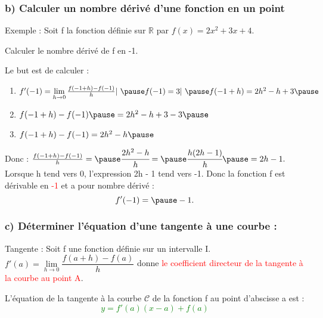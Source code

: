 \documentclass[t]{beamer}
\begin{document}
	\begin{frame}[label=pagebanale]
		\frametitle{b) Calculer un nombre dérivé d'une fonction en un point}
		\pause
		\begin{exampleblock}{Exemple :}
			\pause
			Soit f la fonction définie sur $\mathbb{R}$ par $f(x) = 2x^2 + 3x + 4.$

			\pause
			Calculer le nombre dérivé de f en -1.
			\pause
		\end{exampleblock}
		\begin{block}{Le but est de calculer :}
			\pause
			\begin{enumerate}[]
				\item \textcolor{green}{\(f'(-1) = \lim\limits_{h \rightarrow 0}\frac{f(-1+h) - f(-1)}{h}  |  \ \pause f(-1) = 3  |   \ \pause f(-1+ h) = 2h^2 - h + 3 \pause\)}
				\item \(f(-1+ h) - f(-1) \pause = 2h^2 -h + 3 - 3 \pause \)
				\item \(f(-1+ h) - f(-1)  = 2h^2 -h \pause \)
			\end{enumerate}
			\pause
			Donc : 
			\( \frac{f(-1+ h) - f(-1)}{h} = \pause \cfrac{ 2h^2-h}{h} = \pause \cfrac{ h(2h-1)}{h} \pause = 2h - 1.\) 
			\pause
			Lorsque h tend vers 0, \pause l'expression 2h - 1 tend vers -1. \pause
			Donc la fonction f est dérivable en \textcolor{red}{-1} \pause et a pour nombre dérivé : \pause
			\textcolor{red}{\[f'(-1) = \pause -1.\]}
		\end{block}
	\end{frame}


	\begin{frame}[label=pagebanale]
		\frametitle{c) Déterminer l'équation d'une tangente à une courbe :}
		\pause
		\begin{block}{Tangente :}
			Soit f une fonction définie sur un intervalle I.
			\pause
			$f'(a) = \lim\limits_{h \rightarrow 0}\dfrac{f(a+h) - f(a)}{h}$ \pause donne \textcolor{red}{le coefficient directeur de la tangente à la courbe au point A}.
			\pause
		\end{block}
		\begin{block}{}
			L'équation de la tangente à la courbe $\mathscr{C}$ de la fonction f au point d'abscisse a est : \\
			\pause
			{\Huge \textcolor{green}{\[ y = f'(a)(x-a) + f(a)\]}}
		\end{block}
	\end{frame}
\end{document}
